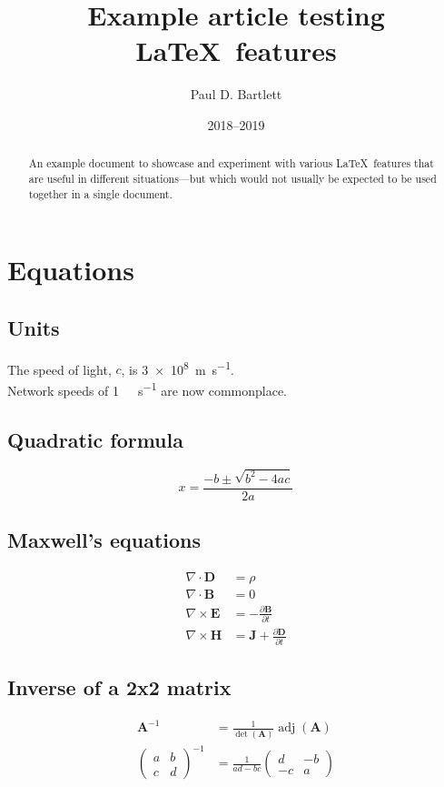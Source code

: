 \documentclass[11pt,a4paper]{article}
\title{Example article testing \LaTeX\ features}
\author{Paul D. Bartlett}
\date{2018--2019}
\begin{document}
\maketitle

\begin{abstract}
An example document to showcase and experiment with various \LaTeX\ features that
are useful in different situations---but which would not usually be expected to be used
together in a single document.
\end{abstract}

\tableofcontents
\listoftables
\listoffigures

\section{Equations}

\subsection{Units}
The speed of light, $c$, is \SI{3e8}{\metre\per\second}.\\
Network speeds of \SI[per-mode=symbol]{1}{\gibi\bit\per\second} are now commonplace.

\subsection{Quadratic formula}
\begin{equation}
x = \frac{-b \pm \sqrt{b^2 - 4ac}}{2a}
\end{equation}

\subsection{Maxwell's equations}
\begin{align}
\nabla \cdot \mathbf{D} &= \rho\\
\nabla \cdot \mathbf{B} &= 0\\
\nabla \times \mathbf{E} &= -\frac{\partial \mathbf{B}} {\partial t}\\
\nabla \times \mathbf{H} &= \mathbf{J} + \frac{\partial \mathbf{D}} {\partial t}
\end{align}

\subsection{Inverse of a 2x2 matrix}
\begin{align}
\mathbf{A}^{-1} &= \frac{1}{\det(\mathbf{A})} \operatorname{adj}(\mathbf{A})\\
\begin{pmatrix}
a & b\\
c & d
\end{pmatrix}^{-1}
&=
\frac{1}{ad-bc}
\begin{pmatrix}
d & -b\\
-c & a
\end{pmatrix}
\end{align}
\end{document}
